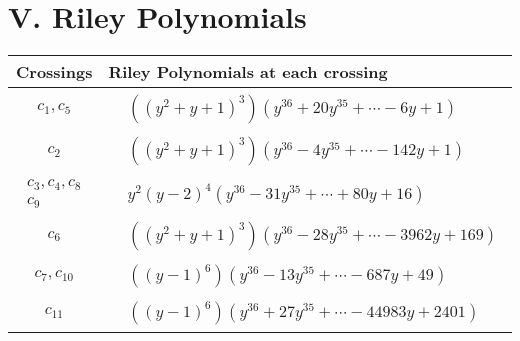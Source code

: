 \documentclass[1p]{elsarticle_modified}
\theoremstyle{definition}
\begin{document}
\centering \section*{ V. Riley Polynomials}
\begin{tabular}{m{50pt}|m{274pt}}
Crossings & \hspace{64pt}Riley Polynomials at each crossing \\
\hline $$\begin{aligned}c_{1},c_{5}\end{aligned}$$&$\begin{aligned}
&((y^2+y+1)^3)(y^{36}+20 y^{35}+\cdots-6 y+1)
\end{aligned}$\\
\hline $$\begin{aligned}c_{2}\end{aligned}$$&$\begin{aligned}
&((y^2+y+1)^3)(y^{36}-4 y^{35}+\cdots-142 y+1)
\end{aligned}$\\
\hline $$\begin{aligned}c_{3},c_{4},c_{8}\\c_{9}\end{aligned}$$&$\begin{aligned}
&y^2(y-2)^4(y^{36}-31 y^{35}+\cdots+80 y+16)
\end{aligned}$\\
\hline $$\begin{aligned}c_{6}\end{aligned}$$&$\begin{aligned}
&((y^2+y+1)^3)(y^{36}-28 y^{35}+\cdots-3962 y+169)
\end{aligned}$\\
\hline $$\begin{aligned}c_{7},c_{10}\end{aligned}$$&$\begin{aligned}
&((y-1)^6)(y^{36}-13 y^{35}+\cdots-687 y+49)
\end{aligned}$\\
\hline $$\begin{aligned}c_{11}\end{aligned}$$&$\begin{aligned}
&((y-1)^6)(y^{36}+27 y^{35}+\cdots-44983 y+2401)
\end{aligned}$\\
\hline
\end{tabular}
\vskip 2pc
\end{document}
